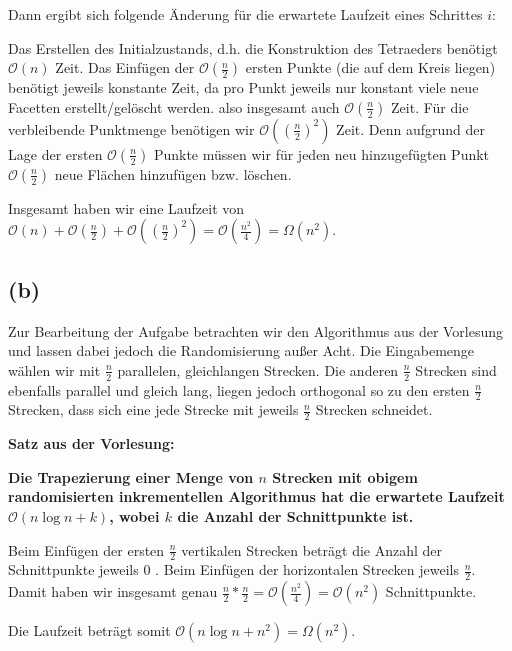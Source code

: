 \documentclass[a4paper]{article}
\begin{document}
Dann ergibt sich folgende Änderung für die erwartete Laufzeit eines Schrittes $i$:

Das Erstellen des Initialzustands, d.h. die Konstruktion des Tetraeders benötigt $\mathcal{O}(n)$ Zeit.
Das Einfügen der $\mathcal{O}(\frac{n}{2})$ ersten Punkte (die auf dem Kreis liegen) benötigt jeweils konstante Zeit,
da pro Punkt jeweils nur konstant viele neue Facetten erstellt/gelöscht werden. also insgesamt auch $\mathcal{O}(\frac{n}{2})$ Zeit.
Für die verbleibende Punktmenge benötigen wir $\mathcal{O}((\frac{n}{2})^2)$ Zeit. Denn aufgrund der Lage der ersten $\mathcal{O}(\frac{n}{2})$ Punkte
müssen wir für jeden neu hinzugefügten Punkt  $\mathcal{O}(\frac{n}{2})$ neue Flächen hinzufügen bzw. löschen. 

Insgesamt haben wir eine Laufzeit von  $\mathcal{O}(n) + \mathcal{O}(\frac{n}{2}) + \mathcal{O}((\frac{n}{2})^2) = \mathcal{O}(\frac{n^2}{4}) = \Omega(n^2) $.


\subsection*{(b)}
Zur Bearbeitung der Aufgabe betrachten wir den Algorithmus aus der Vorlesung und lassen dabei jedoch die Randomisierung außer Acht.
Die Eingabemenge wählen wir mit $\frac{n}{2}$ parallelen, gleichlangen Strecken. Die anderen $\frac{n}{2}$ Strecken sind ebenfalls parallel und gleich lang, liegen jedoch
orthogonal so zu den ersten $\frac{n}{2}$  Strecken, dass sich eine jede Strecke mit jeweils $\frac{n}{2}$ Strecken schneidet.

\begin{figure}[!htb]
\end{figure} 


\textbf{Satz aus der Vorlesung:}

\textbf{Die Trapezierung einer Menge von $n$ Strecken mit obigem randomisierten inkrementellen Algorithmus hat die erwartete Laufzeit
$\mathcal{O}(n\log n + k)$, wobei $k$ die Anzahl der Schnittpunkte ist.}


Beim Einfügen der ersten $\frac{n}{2}$ vertikalen Strecken beträgt die Anzahl der Schnittpunkte jeweils 0 . Beim Einfügen der horizontalen Strecken jeweils $\frac{n}{2}$.
Damit haben wir insgesamt genau $\frac{n}{2} * \frac{n}{2} = \mathcal{O}(\frac{n^2}{4}) = \mathcal{O}(n^2)$ Schnittpunkte.

Die Laufzeit beträgt somit $\mathcal{O}(n \log n + n^2) = \Omega(n^2)$.
  
\end{document}
